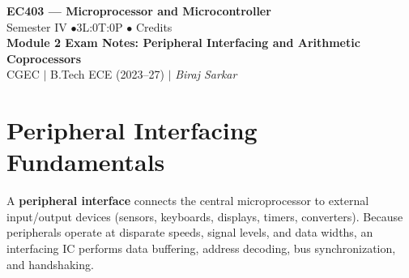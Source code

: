\documentclass[12pt,a4paper]{article}
\begin{document}
\begin{center}
  {\LARGE\bfseries\color{myred} EC403 --- Microprocessor and Microcontroller}\\[5pt]
  {\normalsize\color{mydark} Semester IV \quad$\bullet$\quad 3L:0T:0P \quad$\bullet$ Credits}\\[3pt]
  {\normalsize\color{myteal}\textbf{Module 2 Exam Notes: Peripheral Interfacing and Arithmetic Coprocessors}}\\[3pt]
  {\small\color{mydark} CGEC \;$|$\; B.Tech ECE (2023--27) \;$|$\; \textit{Biraj Sarkar}}
\end{center}
\vspace{2pt}
\noindent{\color{myred}\rule{\linewidth}{1.5pt}}
\vspace{2pt}

\hypersetup{linkcolor=mydark}
\tableofcontents
\hypersetup{linkcolor=myteal}
\newpage

\section{Peripheral Interfacing Fundamentals}

\begin{tcolorbox}[defbox, title={Peripheral Interfacing Concepts}]
A \textbf{peripheral interface} connects the central microprocessor to external input/output devices (sensors, keyboards, displays, timers, converters). Because peripherals operate at disparate speeds, signal levels, and data widths, an interfacing IC performs data buffering, address decoding, bus synchronization, and handshaking.
\end{tcolorbox}
\end{document}
